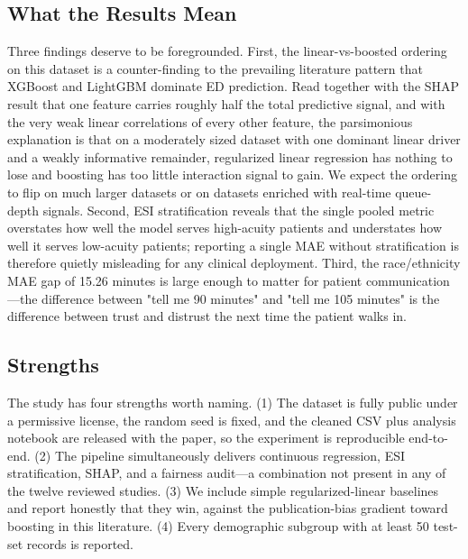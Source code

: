 \documentclass[conference]{IEEEtran}
\begin{document}
\subsection{What the Results Mean}
Three findings deserve to be foregrounded. First, the linear-vs-boosted
ordering on this dataset is a counter-finding to the prevailing
literature pattern that XGBoost and LightGBM dominate ED prediction. Read
together with the SHAP result that one feature carries roughly half the
total predictive signal, and with the very weak linear correlations of every
other feature, the parsimonious explanation is that on a moderately sized
dataset with one dominant linear driver and a weakly informative remainder,
regularized linear regression has nothing to lose and boosting has too
little interaction signal to gain. We expect the ordering to flip on much
larger datasets or on datasets enriched with real-time queue-depth signals.
Second, ESI stratification reveals that the single pooled metric overstates
how well the model serves high-acuity patients and understates how well it
serves low-acuity patients; reporting a single MAE without stratification
is therefore quietly misleading for any clinical deployment. Third, the
race/ethnicity MAE gap of 15.26 minutes is large enough to matter for
patient communication---the difference between "tell me 90 minutes" and
"tell me 105 minutes" is the difference between trust and distrust the next
time the patient walks in.

\subsection{Strengths}
The study has four strengths worth naming. (1) The dataset is fully
public under a permissive license, the random seed is fixed, and the
cleaned CSV plus analysis notebook are released with the paper, so the
experiment is reproducible end-to-end. (2) The pipeline simultaneously
delivers continuous regression, ESI stratification, SHAP, and a fairness
audit---a combination not present in any of the twelve reviewed studies.
(3) We include simple regularized-linear baselines and report honestly
that they win, against the publication-bias gradient toward boosting in
this literature. (4) Every demographic subgroup with at least 50 test-set
records is reported.
\end{document}
